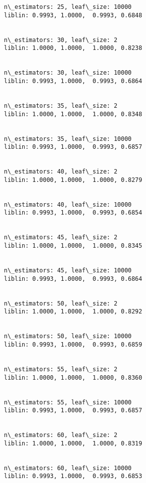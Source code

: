 \documentclass[11pt]{article}
\begin{document}
    \begin{Verbatim}[commandchars=\\\{\}]
n\_estimators: 25, leaf\_size: 10000
liblin: 0.9993, 1.0000,  0.9993, 0.6848 


n\_estimators: 30, leaf\_size: 2
liblin: 1.0000, 1.0000,  1.0000, 0.8238 


n\_estimators: 30, leaf\_size: 10000
liblin: 0.9993, 1.0000,  0.9993, 0.6864 


n\_estimators: 35, leaf\_size: 2
liblin: 1.0000, 1.0000,  1.0000, 0.8348 


n\_estimators: 35, leaf\_size: 10000
liblin: 0.9993, 1.0000,  0.9993, 0.6857 


n\_estimators: 40, leaf\_size: 2
liblin: 1.0000, 1.0000,  1.0000, 0.8279 


n\_estimators: 40, leaf\_size: 10000
liblin: 0.9993, 1.0000,  0.9993, 0.6854 


n\_estimators: 45, leaf\_size: 2
liblin: 1.0000, 1.0000,  1.0000, 0.8345 


n\_estimators: 45, leaf\_size: 10000
liblin: 0.9993, 1.0000,  0.9993, 0.6864 


n\_estimators: 50, leaf\_size: 2
liblin: 1.0000, 1.0000,  1.0000, 0.8292 


n\_estimators: 50, leaf\_size: 10000
liblin: 0.9993, 1.0000,  0.9993, 0.6859 


n\_estimators: 55, leaf\_size: 2
liblin: 1.0000, 1.0000,  1.0000, 0.8360 


n\_estimators: 55, leaf\_size: 10000
liblin: 0.9993, 1.0000,  0.9993, 0.6857 


n\_estimators: 60, leaf\_size: 2
liblin: 1.0000, 1.0000,  1.0000, 0.8319 


n\_estimators: 60, leaf\_size: 10000
liblin: 0.9993, 1.0000,  0.9993, 0.6853 



    \end{Verbatim}
\end{document}
